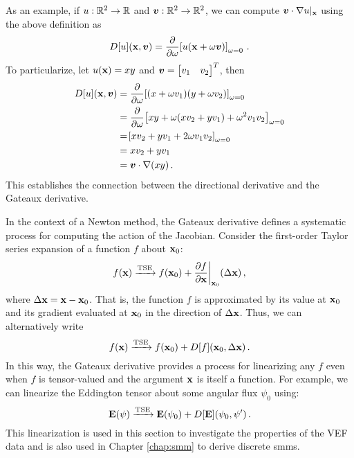 \documentclass[../doc.tex]{subfiles}
\begin{document}
As an example, if $u : \mathbb{R}^2 \rightarrow \mathbb{R}$ and $\boldsymbol{v} : \mathbb{R}^2 \rightarrow \mathbb{R}^2$, we can compute $\boldsymbol{v}\cdot\nabla u|_{\boldsymbol{\mathrm{x}}}$ using the above definition as 
	\begin{equation}
		D[u](\boldsymbol{\mathrm{x}},\boldsymbol{v}) = \frac{\partial }{\partial \omega}\!\left[ u(\boldsymbol{\mathrm{x}} + \omega\boldsymbol{v}) \right]_{\omega = 0} \,. 
	\end{equation}
To particularize, let $u(\boldsymbol{\mathrm{x}}) = xy$ and $\boldsymbol{v} = \begin{bmatrix} v_1 & v_2 \end{bmatrix}^T$, then 
	\begin{equation}
	\begin{aligned}
		D[u](\boldsymbol{\mathrm{x}},\boldsymbol{v}) &= \frac{\partial }{\partial \omega}\!\left[ (x+\omega v_1)(y + \omega v_2) \right]_{\omega = 0} \\
		&= \frac{\partial }{\partial \omega}\!\left[ xy + \omega(xv_2 + yv_1) + \omega^2 v_1 v_2 \right]_{\omega = 0} \\
		&= \!\left[ xv_2 + yv_1 + 2\omega v_1 v_2 \right]_{\omega = 0} \\
		&= x v_2 + y v_1 \\ 
		&= \boldsymbol{v} \cdot \nabla (xy) \,. 
	\end{aligned}
	\end{equation}
This establishes the connection between the directional derivative and the Gateaux derivative. 

In the context of a Newton method, the Gateaux derivative defines a systematic process for computing the action of the Jacobian. Consider the first-order Taylor series expansion of a function $f$ about $\boldsymbol{\mathrm{x}}_0$: 
	\begin{equation}
		f(\boldsymbol{\mathrm{x}}) \xrightarrow{\text{TSE}} f(\boldsymbol{\mathrm{x}}_0) + \frac{\partial f}{\partial \boldsymbol{\mathrm{x}}}\biggr\rvert_{\boldsymbol{\mathrm{x}}_0}(\Delta \boldsymbol{\mathrm{x}}) \,,
	\end{equation}
where $\Delta \boldsymbol{\mathrm{x}} = \boldsymbol{\mathrm{x}} - \boldsymbol{\mathrm{x}}_0$. That is, the function $f$ is approximated by its value at $\boldsymbol{\mathrm{x}}_0$ and its gradient evaluated at $\boldsymbol{\mathrm{x}}_0$ in the direction of $\Delta \boldsymbol{\mathrm{x}}$. 
Thus, we can alternatively write 
	\begin{equation}
		f(\boldsymbol{\mathrm{x}}) \xrightarrow{\text{TSE}} f(\boldsymbol{\mathrm{x}}_0) + D[f](\boldsymbol{\mathrm{x}}_0, \Delta \boldsymbol{\mathrm{x}}) \,. 
	\end{equation}
In this way, the Gateaux derivative provides a process for linearizing any $f$ even when $f$ is tensor-valued and the argument $\boldsymbol{\mathrm{x}}$ is itself a function. For example, we can linearize the Eddington tensor about some angular flux $\psi_0$ using: 
	\begin{equation}
		\boldsymbol{\mathrm{E}}(\psi) \xrightarrow{\text{TSE}} \boldsymbol{\mathrm{E}}(\psi_0) + D[\boldsymbol{\mathrm{E}}](\psi_0,\psi') \,. 
	\end{equation}
This linearization is used in this section to investigate the properties of the VEF data and is also used in Chapter \ref{chap:smm} to derive discrete \glspl{smm}. 
\end{document}
